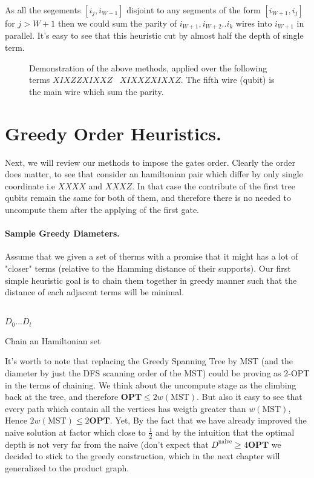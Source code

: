 \documentclass{article}
\begin{document}
\begin{multicols*}{2}
As all the segements \([i_{j}, i_{W-1}]\) disjoint to any segments of the form  \([i_{W+1}, i_{j}]\) for \(j > W+1\) then we could sum the parity of \(i_{W+1},   i_{W+2} .. i_{k}\) wires into \(i_{W+1}\) in parallel. It's easy to see that this heuristic cut by almost half the depth of single term. 

\begin{figure}[H]
  \centering
    
    \caption{ Demonstration of the above methods, applied over the following terms    \( XIXZZXIXXZ \) \ \( XIXXZXIXXZ \). The fifth wire (qubit) is the main wire which sum the parity. }
    \label{fig:average-data-vs-model}
\end{figure}


\section{Greedy Order Heuristics.}
Next, we will review our methods to impose the gates order. Clearly the order does matter, to see that consider an hamiltonian pair which differ by only single coordinate i.e \(XXXX\) and \(XXXZ\). In that case the contribute of the first tree qubits remain the same for both of them, and therefore there is no needed to uncompute them after the applying of the first gate.      
\paragraph{Sample Greedy Diameters.} Assume that we given a set of therms with a promise that it might has a lot of "closer" terms (relative to the Hamming distance of their supports). Our first simple heuristic goal is to chain them together in greedy manner such that the distance of each adjacent terms will be minimal. 


\begin{algorithm}[H]
\SetAlgoLined
\ \\ 
\Return \(D_{0} ... D_{l}\) 
 \caption{Chain an Hamiltonian set }
\end{algorithm}
It's worth to note that replacing the Greedy Spanning Tree by MST (and the diameter by just the DFS scanning order of the MST) could be proving as 2-OPT in the terms of chaining. We think about the uncompute stage as the climbing back at the tree, and therefore \( \textbf{OPT} \le 2w\left(\text{MST} \right) \). But also it easy to see that every path which contain all the vertices has weigth greater than \(w\left(\text{MST} \right) \), Hence  \(2w\left(\text{MST} \right) \le 2\textbf{OPT}\).          
Yet, By the fact that we have already improved the naive solution at factor which close to \(\frac{1}{2}\) and by the intuition that the optimal depth is not very far from the naive (don't expect that \( D^{\text{naive}} \ge 4 \textbf{OPT} \) we decided to stick to the greedy construction, which in the next chapter will generalized to the product graph. 


\end{multicols*}
\end{document}
